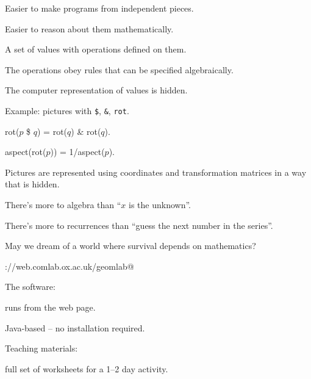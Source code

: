 \item Easier to make programs from independent pieces.
\item Easier to reason about them mathematically.


A set of values with operations defined on them.

\item The operations obey rules that can be specified algebraically.
\item The computer representation of values is hidden.


Example: pictures with \verb/$/, \verb/&/, \verb/rot/.

\item {\vsf rot($p$ \$ $q$) = rot($q$) \& rot($q$)}.
\item {\vsf aspect(rot($p$)) = 1/aspect($p$)}.

Pictures are represented using coordinates and transformation matrices
in a way that is hidden.


\item There's more to algebra than ``$x$ is the unknown''.
\item There's more to recurrences than ``guess the next number in the
series''.
\item May we dream of a world where survival depends on mathematics?


\verb@http://web.comlab.ox.ac.uk/geomlab@

The software:
\item runs from the web page.
\item Java-based -- no installation required.

Teaching materials:
\item full set of worksheets for a 1--2 day activity.

\bye



 
